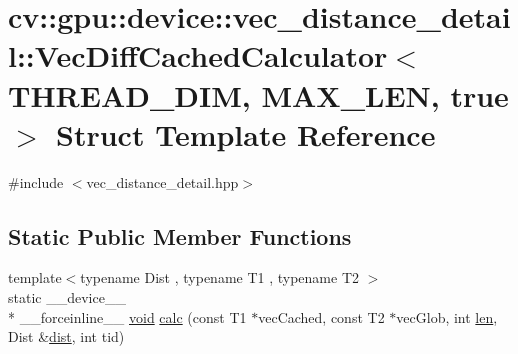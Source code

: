 \hypertarget{structcv_1_1gpu_1_1device_1_1vec__distance__detail_1_1VecDiffCachedCalculator_3_01THREAD__DIM_00_01MAX__LEN_00_01true_01_4}{\section{cv\-:\-:gpu\-:\-:device\-:\-:vec\-\_\-distance\-\_\-detail\-:\-:Vec\-Diff\-Cached\-Calculator$<$ T\-H\-R\-E\-A\-D\-\_\-\-D\-I\-M, M\-A\-X\-\_\-\-L\-E\-N, true $>$ Struct Template Reference}
\label{structcv_1_1gpu_1_1device_1_1vec__distance__detail_1_1VecDiffCachedCalculator_3_01THREAD__DIM_00_01MAX__LEN_00_01true_01_4}
}


{\ttfamily \#include $<$vec\-\_\-distance\-\_\-detail.\-hpp$>$}

\subsection*{Static Public Member Functions}
\begin{DoxyCompactItemize}
\item 
{\footnotesize template$<$typename Dist , typename T1 , typename T2 $>$ }\\static \-\_\-\-\_\-device\-\_\-\-\_\- \\*
\-\_\-\-\_\-forceinline\-\_\-\-\_\- \hyperlink{legacy_8hpp_a8bb47f092d473522721002c86c13b94e}{void} \hyperlink{structcv_1_1gpu_1_1device_1_1vec__distance__detail_1_1VecDiffCachedCalculator_3_01THREAD__DIM_00_01MAX__LEN_00_01true_01_4_a6bbc459aa91200d954ce63d0d549e6c3}{calc} (const T1 $\ast$vec\-Cached, const T2 $\ast$vec\-Glob, int \hyperlink{core__c_8h_accb79be93f4fbcaa15b5a7670569c9f8}{len}, Dist \&\hyperlink{legacy_8hpp_ae895c2003a87eda49126845b7ac3688e}{dist}, int tid)
\end{DoxyCompactItemize}


